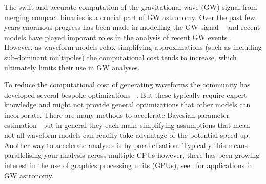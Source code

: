 \documentclass[aps,prd,reprint,superscriptaddress,preprintnumbers,showpacs,nofootinbib]{revtex4-1}
\begin{document}
The swift and accurate computation of the gravitational-wave (GW) signal from
merging compact binaries is a crucial part of GW astronomy. Over the past few
years enormous progress has been made in modelling the GW signal
~\cite{Mehta2017AccurateIG,Mehta2019IncludingMM,Khan2020IncludingHO,
Estelles2020IMRPhenomTPAP,2018PhRvD..98h4028C,Nagar2018TimedomainEG,
Nagar2019AME,Rifat2020SurrogateMF,PhysRevD.99.064045,Khan2019PhenomenologicalMF,
PhysRevResearch.1.033015,Williams2019APN,Ossokine2020MultipolarEW,
Dietrich2019MatterII,Dietrich2019ImprovingTN,Pratten2020SettingTC,
London2018FirstHM,Nagar2020AME,Pratten2020LetsTA,GarciaQuiros2020IMRPhenomXHMAM}
and recent models have played imporant roles in the analysis of recent GW
events~\cite{LIGOScientific:2020stg,Abbott:2020khf}. However, as waveform models
relax simplifying approximations (such as including sub-dominant multipoles) the
computational cost tends to increase, which ultimately limits their use in GW
analyses.


To reduce the computational cost of generating waveforms the community has
developed several bespoke optimizations
~\cite{Devine2016OptimizingST,Knowles:2018hqq,PhysRevD.99.021501}. But these
typically require expert knowledge and might not provide general optimizations
that other models can incorporate. There are many methods to accelerate Bayesian
parameter estimation~\cite{PhysRevD.94.044031,
Morisaki2020RapidPE,Canizares2015AcceleratedGW,
Canizares2013GravitationalWP,Zackay2018RelativeBA,
Cornish2020BlackHH,Vinciguerra2017AcceleratingGW,
GarciaQuiros2020AcceleratingTE,Smith2014RapidlyET} but in general they each make
simplifying assumptions that mean not all waveform models can readily take
advantage of the potential speed-up. Another way to accelerate analyses is by
parallelisation. Typically this means parallelising your analysis across
multiple CPUs however, there has been growing interest in the use of graphics
processing units (GPUs),
see~\cite{Guo2017AccelerationOL,Keitel2018FasterSF,Katz2020GPUacceleratedMB,Talbot2019ParallelizedIF,Wysocki2019AcceleratingPI,Usman2015ThePS}
for applications in GW astronomy.
\end{document}
